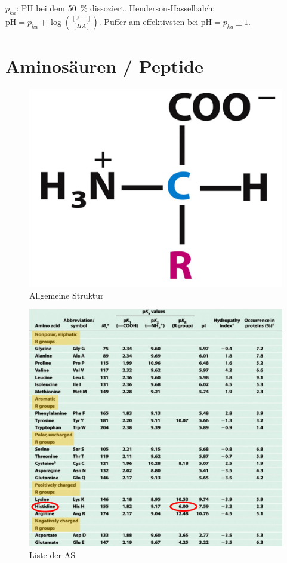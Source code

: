 \documentclass[a4paper,twocolumn,english,fontsize=7,DIV=16]{scrartcl}
\begin{document}
$p_{ka}$: PH bei dem \SI{50}{\percent} dissoziert. Henderson-Hasselbalch:
$\text{pH} = p_{ka} + \log\left(\frac{[A-]}{[HA]}\right)$. Puffer am effektivsten bei
$\text{pH} = p_{ka} \pm 1$.

\section{Aminosäuren / Peptide}

\begin{figure}
	\centering
	\includegraphics[width=\linewidth]{img/as.png}
	\caption{Allgemeine Struktur}
\end{figure}

\begin{figure}
	\centering
	\includegraphics[width=\linewidth]{img/as_liste.png}
	\caption{Liste der AS}
\end{figure}
\end{document}
